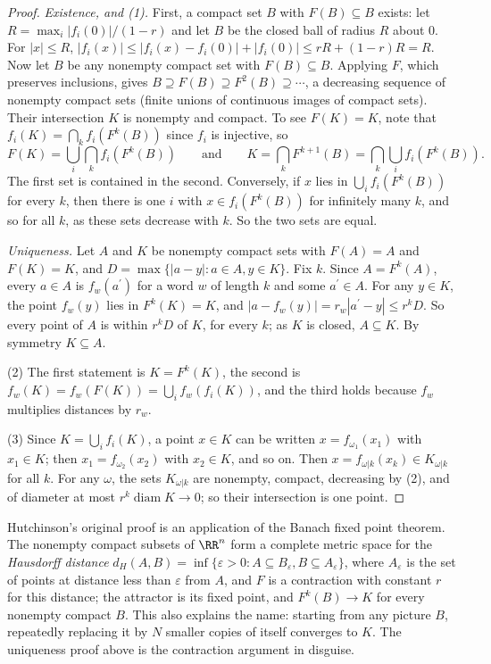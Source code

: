 \begin{proof}
\emph{Existence, and (1).} First, a compact set $B$ with $F(B) \subseteq B$ exists: let $R = \max_i|f_i(0)|/(1 - r)$ and let $B$ be the closed ball of radius $R$ about $0$. For $|x| \leq R$,
$|f_i(x)| \leq |f_i(x) - f_i(0)| + |f_i(0)| \leq rR + (1 - r)R = R$. Now let $B$ be any nonempty compact set with $F(B) \subseteq B$. Applying $F$, which preserves inclusions, gives
$B \supseteq F(B) \supseteq F^2(B) \supseteq \cdots$, a decreasing sequence of nonempty compact sets (finite unions of continuous images of compact sets). Their intersection $K$ is nonempty and compact. To
see $F(K) = K$, note that $f_i(K) = \bigcap_kf_i(F^k(B))$ since $f_i$ is injective, so
\[
F(K) = \bigcup_i\bigcap_kf_i(F^k(B)) \qquad\text{and}\qquad K = \bigcap_kF^{k+1}(B) = \bigcap_k\bigcup_if_i(F^k(B)).
\]
The first set is contained in the second. Conversely, if $x$ lies in $\bigcup_if_i(F^k(B))$ for every $k$, then there is one $i$ with $x \in f_i(F^k(B))$ for infinitely many $k$, and so for all $k$, as
these sets decrease with $k$. So the two sets are equal.

\emph{Uniqueness.} Let $A$ and $K$ be nonempty compact sets with $F(A) = A$ and $F(K) = K$, and $D = \max\{|a - y| : a \in A, y \in K\}$. Fix $k$. Since $A = F^k(A)$, every $a \in A$ is $f_w(a^{\prime})$
for a word $w$ of length $k$ and some $a^{\prime} \in A$. For any $y \in K$, the point $f_w(y)$ lies in $F^k(K) = K$, and $|a - f_w(y)| = r_w|a^{\prime} - y| \leq r^kD$. So every point of $A$ is
within $r^kD$ of $K$, for every $k$; as $K$ is closed, $A \subseteq K$. By symmetry $K \subseteq A$.

(2) The first statement is $K = F^k(K)$, the second is $f_w(K) = f_w(F(K)) = \bigcup_if_w(f_i(K))$, and the third holds because $f_w$ multiplies distances by $r_w$.

(3) Since $K = \bigcup_if_i(K)$, a point $x \in K$ can be written $x = f_{\omega_1}(x_1)$ with $x_1 \in K$; then $x_1 = f_{\omega_2}(x_2)$ with $x_2 \in K$, and so on. Then
$x = f_{\omega|k}(x_k) \in K_{\omega|k}$ for all $k$. For any $\omega$, the sets $K_{\omega|k}$ are nonempty, compact, decreasing by (2), and of diameter at most $r^k\operatorname{diam}K \to 0$; so
their intersection is one point.
\end{proof}

\begin{remark}\label{geometric-measure-theory:remark-hutchinson}
Hutchinson's original proof \cite{hutchinson-1981} is an application of the Banach fixed point theorem. The nonempty compact subsets of $\RR^n$ form a complete metric space for the
\emph{Hausdorff distance} $d_H(A, B) = \inf\{\varepsilon > 0 : A \subseteq B_\varepsilon, B \subseteq A_\varepsilon\}$, where $A_\varepsilon$ is the set of points at distance less than $\varepsilon$ from
$A$, and $F$ is a contraction with constant $r$ for this distance; the attractor is its fixed point, and $F^k(B) \to K$ for every nonempty compact $B$. This also explains the name: starting from any
picture $B$, repeatedly replacing it by $N$ smaller copies of itself converges to $K$. The uniqueness proof above is the contraction argument in disguise.
\end{remark}

